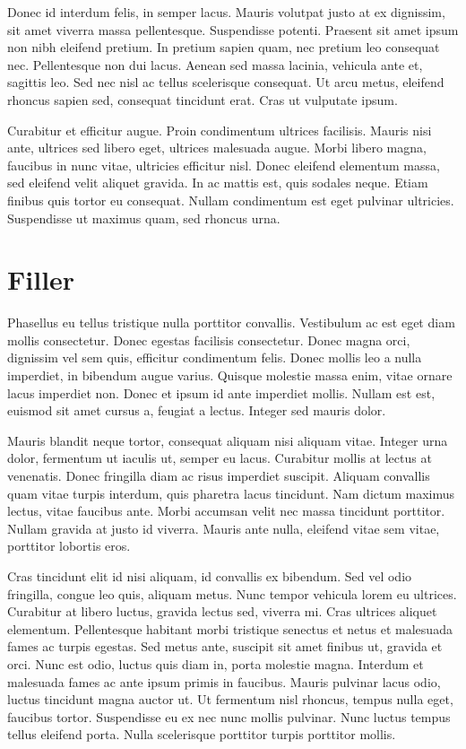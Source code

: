 Donec id interdum felis, in semper lacus. Mauris volutpat justo at ex dignissim, sit amet viverra massa pellentesque. Suspendisse potenti. Praesent sit amet ipsum non nibh eleifend pretium. In pretium sapien quam, nec pretium leo consequat nec. Pellentesque non dui lacus. Aenean sed massa lacinia, vehicula ante et, sagittis leo. Sed nec nisl ac tellus scelerisque consequat. Ut arcu metus, eleifend rhoncus sapien sed, consequat tincidunt erat. Cras ut vulputate ipsum.

Curabitur et efficitur augue. Proin condimentum ultrices facilisis. Mauris nisi ante, ultrices sed libero eget, ultrices malesuada augue. Morbi libero magna, faucibus in nunc vitae, ultricies efficitur nisl. Donec eleifend elementum massa, sed eleifend velit aliquet gravida. In ac mattis est, quis sodales neque. Etiam finibus quis tortor eu consequat. Nullam condimentum est eget pulvinar ultricies. Suspendisse ut maximus quam, sed rhoncus urna.

\section{Filler}
Phasellus eu tellus tristique nulla porttitor convallis. Vestibulum ac est eget diam mollis consectetur. Donec egestas facilisis consectetur. Donec magna orci, dignissim vel sem quis, efficitur condimentum felis. Donec mollis leo a nulla imperdiet, in bibendum augue varius. Quisque molestie massa enim, vitae ornare lacus imperdiet non. Donec et ipsum id ante imperdiet mollis. Nullam est est, euismod sit amet cursus a, feugiat a lectus. Integer sed mauris dolor.

Mauris blandit neque tortor, consequat aliquam nisi aliquam vitae. Integer urna dolor, fermentum ut iaculis ut, semper eu lacus. Curabitur mollis at lectus at venenatis. Donec fringilla diam ac risus imperdiet suscipit. Aliquam convallis quam vitae turpis interdum, quis pharetra lacus tincidunt. Nam dictum maximus lectus, vitae faucibus ante. Morbi accumsan velit nec massa tincidunt porttitor. Nullam gravida at justo id viverra. Mauris ante nulla, eleifend vitae sem vitae, porttitor lobortis eros.

Cras tincidunt elit id nisi aliquam, id convallis ex bibendum. Sed vel odio fringilla, congue leo quis, aliquam metus. Nunc tempor vehicula lorem eu ultrices. Curabitur at libero luctus, gravida lectus sed, viverra mi. Cras ultrices aliquet elementum. Pellentesque habitant morbi tristique senectus et netus et malesuada fames ac turpis egestas. Sed metus ante, suscipit sit amet finibus ut, gravida et orci. Nunc est odio, luctus quis diam in, porta molestie magna. Interdum et malesuada fames ac ante ipsum primis in faucibus. Mauris pulvinar lacus odio, luctus tincidunt magna auctor ut. Ut fermentum nisl rhoncus, tempus nulla eget, faucibus tortor. Suspendisse eu ex nec nunc mollis pulvinar. Nunc luctus tempus tellus eleifend porta. Nulla scelerisque porttitor turpis porttitor mollis.

